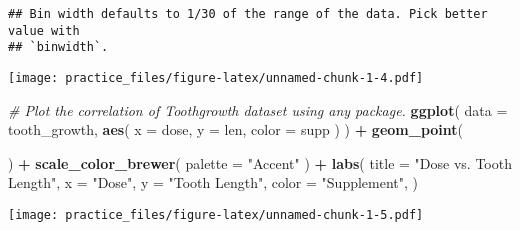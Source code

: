 \documentclass[
]{article}
\newenvironment{Shaded}{\begin{snugshade}}{\end{snugshade}}
\newcommand{\AttributeTok}[1]{\textcolor[rgb]{0.13,0.29,0.53}{#1}}
\newcommand{\CommentTok}[1]{\textcolor[rgb]{0.56,0.35,0.01}{\textit{#1}}}
\newcommand{\FunctionTok}[1]{\textcolor[rgb]{0.13,0.29,0.53}{\textbf{#1}}}
\newcommand{\NormalTok}[1]{#1}
\newcommand{\SpecialCharTok}[1]{\textcolor[rgb]{0.81,0.36,0.00}{\textbf{#1}}}
\newcommand{\StringTok}[1]{\textcolor[rgb]{0.31,0.60,0.02}{#1}}
\begin{document}
\begin{verbatim}
## Bin width defaults to 1/30 of the range of the data. Pick better value with
## `binwidth`.
\end{verbatim}

\texttt{[image: practice\_files/figure-latex/unnamed-chunk-1-4.pdf]}

\begin{Shaded}
\begin{Highlighting}[]
\CommentTok{\# Plot the correlation of Toothgrowth dataset using any package.}
\FunctionTok{ggplot}\NormalTok{(}
  \AttributeTok{data =}\NormalTok{ tooth\_growth,}
  \FunctionTok{aes}\NormalTok{(    }\AttributeTok{x =} \StringTok{\textasciigrave{}}\AttributeTok{dose}\StringTok{\textasciigrave{}}\NormalTok{,    }\AttributeTok{y =} \StringTok{\textasciigrave{}}\AttributeTok{len}\StringTok{\textasciigrave{}}\NormalTok{,    }\AttributeTok{color =} \StringTok{\textasciigrave{}}\AttributeTok{supp}\StringTok{\textasciigrave{}}\NormalTok{  )}
\NormalTok{) }\SpecialCharTok{+} \FunctionTok{geom\_point}\NormalTok{(}
  
\NormalTok{) }\SpecialCharTok{+} \FunctionTok{scale\_color\_brewer}\NormalTok{(}
  \AttributeTok{palette =} \StringTok{"Accent"}
\NormalTok{) }\SpecialCharTok{+} \FunctionTok{labs}\NormalTok{(}
  \AttributeTok{title =} \StringTok{"Dose vs. Tooth Length"}\NormalTok{,}
  \AttributeTok{x =} \StringTok{"Dose"}\NormalTok{,}
  \AttributeTok{y =} \StringTok{"Tooth Length"}\NormalTok{,}
  \AttributeTok{color =} \StringTok{"Supplement"}\NormalTok{,}
\NormalTok{)}
\end{Highlighting}
\end{Shaded}

\texttt{[image: practice\_files/figure-latex/unnamed-chunk-1-5.pdf]}
\end{document}

